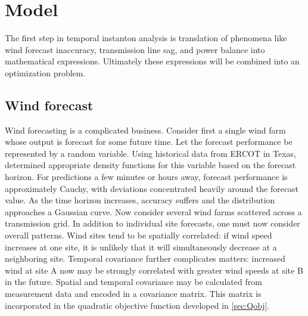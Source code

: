 \documentclass[conference]{IEEEtran}
\begin{document}

\section{Model}\label{sec:model}

The first step in temporal instanton analysis is translation of phenomena like wind forecast inaccuracy, transmission line sag, and power balance into mathematical expressions. Ultimately these expressions will be combined into an optimization problem.

\subsection{Wind forecast}\label{sec:wind-forecast}

Wind forecasting is a complicated business. Consider first a single wind farm whose output is forecast for some future time. Let the forecast performance be represented by a random variable. Using historical data from ERCOT in Texas, \cite{hodge2011} determined appropriate density functions for this variable based on the forecast horizon. For predictions a few minutes or hours away, forecast performance is approximately Cauchy, with deviations concentrated heavily around the forecast value. As the time horizon increases, accuracy suffers and the distribution approaches a Gaussian curve. Now consider several wind farms scattered across a transmission grid. In addition to individual site forecasts, one must now consider overall patterns. Wind sites tend to be spatially correlated: if wind speed increases at one site, it is unlikely that it will simultaneously decrease at a neighboring site. Temporal covariance further complicates matters: increased wind at site A now may be strongly correlated with greater wind speeds at site B in the future. Spatial and temporal covariance may be calculated from measurement data and encoded in a covariance matrix. This matrix is incorporated in the quadratic objective function developed in \ref{sec:Qobj}.
\end{document}
